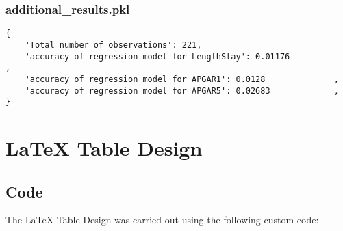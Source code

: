 \documentclass[11pt]{article}
\begin{document}
\subsubsection*{additional\_results.pkl}

\begin{Verbatim}[tabsize=4]
{
    'Total number of observations': 221,
    'accuracy of regression model for LengthStay': 0.01176            ,
    'accuracy of regression model for APGAR1': 0.0128              ,
    'accuracy of regression model for APGAR5': 0.02683             ,
}
\end{Verbatim}

\section{LaTeX Table Design} \subsection{Code}The LaTeX Table Design was carried out using the following custom code:
\end{document}
